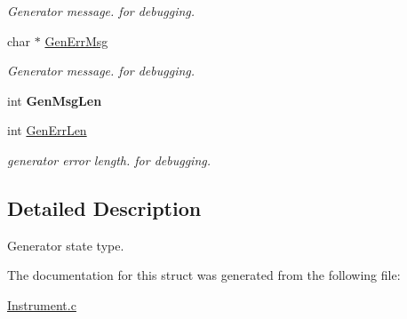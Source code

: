 \begin{DoxyCompactItemize}
\begin{DoxyCompactList}\small\item\em Generator message. for debugging. \end{DoxyCompactList}\item 
\mbox{\label{struct_g_e_n___s_t_a_t_e_acffb6e8e6adb7d93362336c4c936f246}} 
char $\ast$ \hyperlink{struct_g_e_n___s_t_a_t_e_acffb6e8e6adb7d93362336c4c936f246}{Gen\+Err\+Msg}
\begin{DoxyCompactList}\small\item\em Generator message. for debugging. \end{DoxyCompactList}\item 
\mbox{\label{struct_g_e_n___s_t_a_t_e_a3b5ecac97737f44fc64d156260b8cdea}} 
int {\bfseries Gen\+Msg\+Len}
\item 
\mbox{\label{struct_g_e_n___s_t_a_t_e_a8c70ddfac989c98c7c1996b911c2528f}} 
int \hyperlink{struct_g_e_n___s_t_a_t_e_a8c70ddfac989c98c7c1996b911c2528f}{Gen\+Err\+Len}
\begin{DoxyCompactList}\small\item\em generator error length. for debugging. \end{DoxyCompactList}\end{DoxyCompactItemize}


\subsection{Detailed Description}
Generator state type. 

The documentation for this struct was generated from the following file\+:\begin{DoxyCompactItemize}
\item 
\hyperlink{_instrument_8c}{Instrument.\+c}\end{DoxyCompactItemize}
